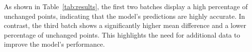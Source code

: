 As shown in Table~\ref{tab:results}, the first two batches display a high percentage of unchanged points, indicating that the model's predictions are highly accurate. In contrast, the third batch shows a significantly higher mean difference and a lower percentage of unchanged points. This highlights the need for additional data to improve the model's performance.

